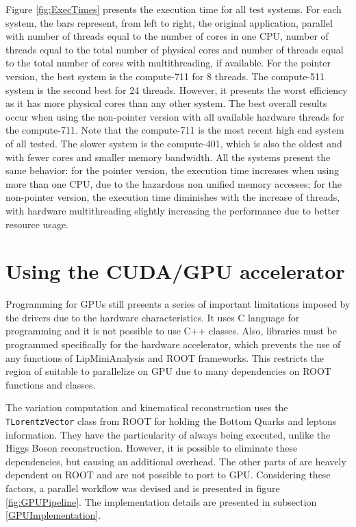 Figure \ref{fig:ExecTimes} presents the execution time for all test systems. For each system, the bars represent, from left to right, the original application, parallel with number of threads equal to the number of cores in one CPU, number of threads equal to the total number of physical cores and number of threads equal to the total number of cores with multithreading, if available. For the pointer version, the best system is the compute-711 for 8 threads. The compute-511 system is the second best for 24 threads. However, it presents the worst efficiency as it has more physical cores than any other system. The best overall results occur when using the non-pointer version with all available hardware threads for the compute-711. Note that the compute-711 is the most recent high end system of all tested. The slower system is the compute-401, which is also the oldest and with fewer cores and smaller memory bandwidth. All the systems present the same behavior: for the pointer version, the execution time increases when using more than one CPU, due to the hazardous non unified memory accesses; for the non-pointer version, the execution time diminishes with the increase of threads, with hardware multithreading slightly increasing the performance due to better resource usage.

\section{Using the \nvidia CUDA/GPU accelerator}
\label{Parallelization:GPU}

Programming for GPUs still presents a series of important limitations imposed by the drivers due to the hardware characteristics. It uses C language for programming and it is not possible to use C++ classes. Also, libraries must be programmed specifically for the hardware accelerator, which prevents the use of any functions of LipMiniAnalysis and ROOT frameworks. This restricts the region of \ttDilepKinFit suitable to parallelize on GPU due to many dependencies on ROOT functions and classes.

The variation computation and kinematical reconstruction uses the \texttt{TLorentzVector} class from ROOT for holding the Bottom Quarks and leptons information. They have the particularity of always being executed, unlike the Higgs Boson reconstruction. However, it is possible to eliminate these dependencies, but causing an additional overhead. The other parts of \ttDilepKinFit are heavely dependent on ROOT and are not possible to port to GPU. Considering these factors, a parallel workflow was devised and is presented in figure \ref{fig:GPUPipeline}. The implementation details are presented in subsection \ref{GPUImplementation}. 

